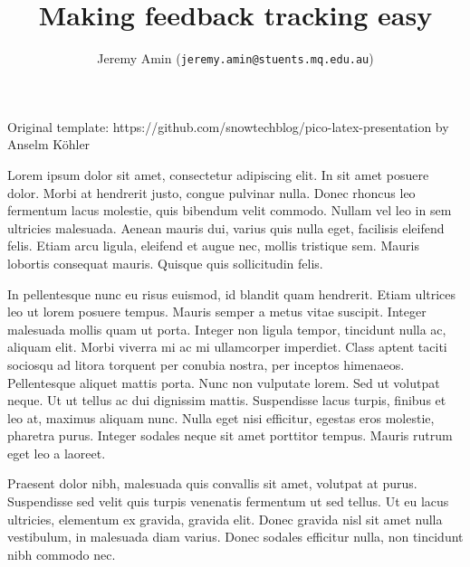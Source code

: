 \documentclass[unknownkeysallowed,usepdftitle=false, aspectratio=169, parskip=full]{beamer}
\title{Making feedback tracking easy}
\author{Jeremy Amin\inst{1} (\texttt{jeremy.amin@stuents.mq.edu.au})}
\newcommand{\secvariable}{nothing}
\newcommand{\mysection}[1]{\renewcommand{\secvariable}{#1}
}
\begin{document}
\mysection{abstract}
\begin{frame}\label{\secvariable}



\parbox{\linewidth}{

Original template: https://github.com/snowtechblog/pico-latex-presentation by Anselm Köhler


\vspace{12pt}

Lorem ipsum dolor sit amet, consectetur adipiscing elit. In sit amet posuere dolor. Morbi at hendrerit justo, congue pulvinar nulla. Donec rhoncus leo fermentum lacus molestie, quis bibendum velit commodo. Nullam vel leo in sem ultricies malesuada. Aenean mauris dui, varius quis nulla eget, facilisis eleifend felis. Etiam arcu ligula, eleifend et augue nec, mollis tristique sem. Mauris lobortis consequat mauris. Quisque quis sollicitudin felis.

 \vspace{12pt}
 
In pellentesque nunc eu risus euismod, id blandit quam hendrerit. Etiam ultrices leo ut lorem posuere tempus. Mauris semper a metus vitae suscipit. Integer malesuada mollis quam ut porta. Integer non ligula tempor, tincidunt nulla ac, aliquam elit. Morbi viverra mi ac mi ullamcorper imperdiet. Class aptent taciti sociosqu ad litora torquent per conubia nostra, per inceptos himenaeos. Pellentesque aliquet mattis porta. Nunc non vulputate lorem. Sed ut volutpat neque. Ut ut tellus ac dui dignissim mattis. Suspendisse lacus turpis, finibus et leo at, maximus aliquam nunc. Nulla eget nisi efficitur, egestas eros molestie, pharetra purus. Integer sodales neque sit amet porttitor tempus. Mauris rutrum eget leo a laoreet.

 \vspace{12pt}
 
Praesent dolor nibh, malesuada quis convallis sit amet, volutpat at purus. Suspendisse sed velit quis turpis venenatis fermentum ut sed tellus. Ut eu lacus ultricies, elementum ex gravida, gravida elit. Donec gravida nisl sit amet nulla vestibulum, in malesuada diam varius. Donec sodales efficitur nulla, non tincidunt nibh commodo nec. 
}


   
\end{frame}
\end{document}
